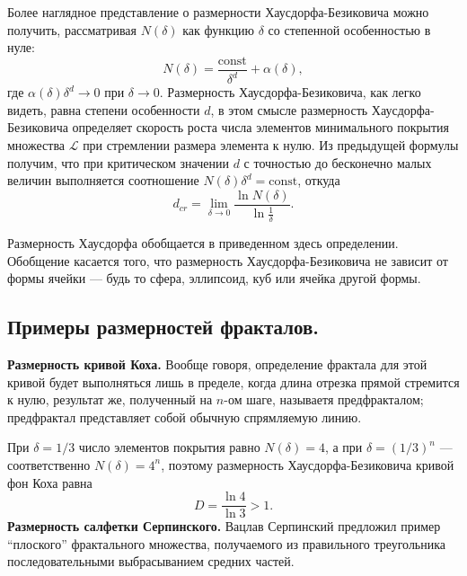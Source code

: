 Более наглядное представление о размерности Хаусдорфа-Безиковича можно получить, рассматривая $N(\delta)$ как функцию $\delta$ со степенной особенностью в нуле:
\begin{equation*}
    N(\delta) = \dfrac{\text{const}}{\delta^{d}} + \alpha(\delta),
\end{equation*}
где $\alpha(\delta) \delta^{d} \rightarrow 0$ при $\delta \rightarrow 0$. Размерность Хаусдорфа-Безиковича, как легко видеть, равна степени особенности $d$, в этом смысле размерность Хаусдорфа-Безиковича определяет скорость роста числа элементов минимального покрытия множества $\mathcal{L}$ при стремлении размера элемента к нулю. Из предыдущей формулы получим, что при критическом значении $d$ с точностью до бесконечно малых величин выполняется соотношение $N(\delta) \delta^{d} = \text{const}$, откуда
\begin{equation*}
    d_{cr} = \lim \limits_{\delta \to 0} \dfrac{\ln{N(\delta)}}{\ln{\frac{1}{\delta}}}.
\end{equation*}

Размерность Хаусдорфа обобщается в приведенном здесь определении. Обобщение касается того, что размерность Хаусдорфа-Безиковича не зависит от формы ячейки --- будь то сфера, эллипсоид, куб или ячейка другой формы.\\
\subsection{Примеры размерностей фракталов.}\textbf{Размерность кривой Коха.} Вообще говоря, определение фрактала для этой кривой будет выполняться лишь в пределе, когда длина отрезка прямой стремится к нулю, результат же, полученный на $n$-ом шаге, называетя предфракталом; предфрактал представляет собой обычную спрямляемую линию.

При $\delta = 1/3$ число элементов покрытия равно $N(\delta) = 4$, а при $\delta = (1/3)^{n}$ --- соответственно $N(\delta) = 4^{n}$, поэтому размерность Хаусдорфа-Безиковича кривой фон Коха равна
\begin{equation*}
    D = \frac{\ln{4}}{\ln{3}} > 1.
\end{equation*}
\textbf{Размерность салфетки Серпинского.} Вацлав Серпинский предложил пример ``плоского'' фрактального множества, получаемого из правильного треугольника последовательными выбрасыванием средних частей.

